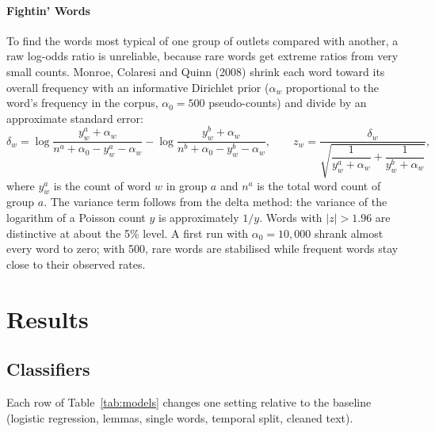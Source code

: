 \documentclass[11pt,a4paper]{article}
\begin{document}
\paragraph{Fightin' Words} To find the words most typical of one group of outlets compared with another, a raw log-odds ratio is unreliable, because rare words get extreme ratios from very small counts. Monroe, Colaresi and Quinn (2008) shrink each word toward its overall frequency with an informative Dirichlet prior ($\alpha_w$ proportional to the word's frequency in the corpus, $\alpha_0=500$ pseudo-counts) and divide by an approximate standard error:
\begin{equation}
\delta_w = \log \frac{y_w^a + \alpha_w}{n^a + \alpha_0 - y_w^a - \alpha_w} - \log \frac{y_w^b + \alpha_w}{n^b + \alpha_0 - y_w^b - \alpha_w}, \qquad
z_w = \frac{\delta_w}{\sqrt{\dfrac{1}{y_w^a + \alpha_w} + \dfrac{1}{y_w^b + \alpha_w}}},
\end{equation}
where $y_w^a$ is the count of word $w$ in group $a$ and $n^a$ is the total word count of group $a$. The variance term follows from the delta method: the variance of the logarithm of a Poisson count $y$ is approximately $1/y$. Words with $|z|>1.96$ are distinctive at about the 5\% level. A first run with $\alpha_0=10{,}000$ shrank almost every word to zero; with 500, rare words are stabilised while frequent words stay close to their observed rates.

\section{Results}
\label{sec:results}

\subsection{Classifiers}
\label{sec:res-classifier}
Each row of Table~\ref{tab:models} changes one setting relative to the baseline (logistic regression, lemmas, single words, temporal split, cleaned text).
\end{document}
